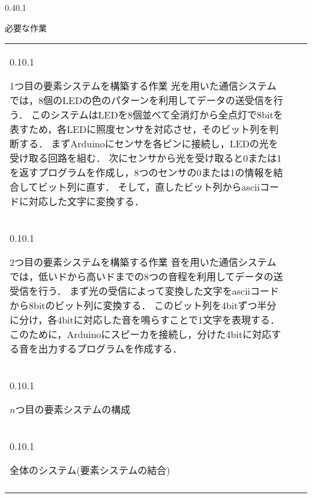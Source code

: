 \documentclass[a4j,11pt,dvipdfmx]{jsarticle}
\makeatletter
\renewcommand{\section}{%
    \@startsection{section}{1}{\z@}%
    {0.4\Cvs}{0.1\Cvs}%
    {\normalfont\headfont\raggedright}}
\renewcommand{\subsection}{%
    \@startsection{subsection}{1}{\z@}%
    {0.1\Cvs}{0.1\Cvs}%
    {\normalfont\headfont\raggedright}}
\newcommand{\bhline}{\noalign{\hrule height 1pt}}
\makeatother
\begin{document}
\section{必要な作業}\label{sec:tasks}
\begin{table}[H]
\vspace{-1em}
\centering
\begin{tabular}{bp{}b}
\bhline
\subsection{1つ目の要素システムを構築する作業}
光を用いた通信システムでは，8個のLEDの色のパターンを利用してデータの送受信を行う．
このシステムはLEDを8個並べて全消灯から全点灯で8bitを表すため，各LEDに照度センサを対応させ，そのビット列を判断する．
まずArduinoにセンサを各ピンに接続し，LEDの光を受け取る回路を組む．
次にセンサから光を受け取ると0または1を返すプログラムを作成し，8つのセンサの0または1の情報を結合してビット列に直す．
そして，直したビット列からasciiコードに対応した文字に変換する．
	 \\ \bhline
\subsection{2つ目の要素システムを構築する作業}
音を用いた通信システムでは，低いドから高いドまでの8つの音程を利用してデータの送受信を行う．
まず光の受信によって変換した文字をasciiコードから8bitのビット列に変換する．
このビット列を4bitずつ半分に分け，各4bitに対応した音を鳴らすことで1文字を表現する．
このために，Arduinoにスピーカを接続し，分けた4bitに対応する音を出力するプログラムを作成する．
	 \\ \bhline
\subsection{$n$つ目の要素システムの構成}
	
	 \\ \bhline
\subsection{全体のシステム(要素システムの結合)}
	
	\\ \bhline
\end{tabular}
\end{table}

\end{document}
